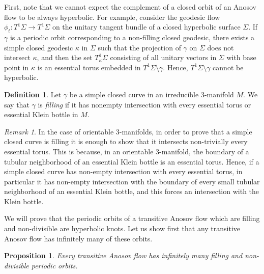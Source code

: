 \documentclass[12pt]{amsart}
\newtheorem{proposition}[theorem]{Proposition}
\theoremstyle{definition}
\newtheorem{definition}[theorem]{Definition}
\theoremstyle{remark}
\newtheorem{remark}[theorem]{Remark}
\begin{document}
First, note that we cannot expect the complement of a closed orbit of an Anosov flow to be always hyperbolic. For example, consider the geodesic flow $\phi_t:T^1 \Sigma\to T^1 \Sigma$ on the unitary tangent bundle of a closed hyperbolic surface $\Sigma$. If $\gamma$ is a periodic orbit corresponding to a non-filling closed geodesic, there exists a simple closed geodesic $\kappa$ in $\Sigma$ such that the projection of $\gamma$ on $\Sigma$ does not intersect $\kappa$, and then the set $T^1_\kappa \Sigma$ consisting of all unitary vectors in $\Sigma$ with base point in $\kappa$ is an essential torus embedded in $T^1\Sigma\setminus\gamma$. Hence, $T^1 \Sigma\setminus\gamma$ cannot be hyperbolic. 


\begin{definition}\label{def:filling orbit}
    Let $\gamma$ be a simple closed curve in an irreducible 3-manifold $M$. We say that $\gamma$ is \emph{filling} if it has nonempty intersection with every essential torus or essential Klein bottle in $M$. 
\end{definition}


\begin{remark}
    In the case of orientable 3-manifolds, in order to prove that a simple closed curve is filling it is enough to show that it intersects non-trivially every essential torus. This is because, in an orientable 3-manifold, the boundary of a tubular neighborhood of an essential Klein bottle is an essential torus. Hence, if a simple closed curve has non-empty intersection with every essential torus, in particular it has non-empty intersection with the boundary of every small tubular neighborhood of an essential Klein bottle, and this forces an intersection with the Klein bottle. 
\end{remark}


We will prove that the periodic orbits of a transitive Anosov flow which are filling and non-divisible are hyperbolic knots. Let us show first that any transitive Anosov flow has infinitely many of these orbits.


\begin{proposition}
    Every transitive Anosov flow has infinitely many filling and non-divisible periodic orbits.
\end{proposition}
\end{document}
